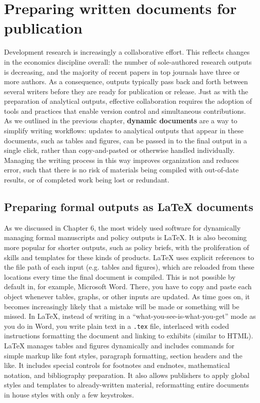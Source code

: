 \section{Preparing written documents for publication}

Development research is increasingly a collaborative effort.
This reflects changes in the economics discipline overall:
the number of sole-authored research outputs is decreasing,
and the majority of recent papers in top journals have three or more
authors.
As a consequence, outputs typically pass back and forth between several writers
before they are ready for publication or release.
Just as with the preparation of analytical outputs,
effective collaboration requires the adoption of tools and practices
that enable version control and simultaneous contributions.
As we outlined in the previous chapter,
\textbf{dynamic documents} are a way to simplify writing workflows:
updates to analytical outputs that appear in these documents, such as tables and figures,
can be passed in to the final output in a single click,
rather than copy-and-pasted or otherwise handled individually.
Managing the writing process in this way
improves organization and reduces error,
such that there is no risk of materials being compiled
with out-of-date results, or of completed work being lost or redundant.

\subsection{Preparing formal outputs as {\LaTeX} documents}

As we discussed in Chapter 6, the most widely used software
for dynamically managing formal manuscripts and policy outputs is {\LaTeX}.
It is also becoming more popular for shorter outputs,
such as policy briefs,
with the proliferation of skills and templates for these kinds of products.
\index{\LaTeX}
{\LaTeX} uses explicit references to the file path of each input (e.g. tables and figures),
which are reloaded from these locations every time the final document is compiled.
This is not possible by default in, for example, Microsoft Word.
There, you have to copy and paste each object
whenever tables, graphs, or other inputs are updated.
As time goes on, it becomes increasingly likely
that a mistake will be made or something will be missed.
In {\LaTeX}, instead of writing in a
``what-you-see-is-what-you-get'' mode as you do in Word,
you write plain text in a \texttt{.tex} file,
interlaced with coded instructions formatting the document and linking to exhibits (similar to HTML).
{\LaTeX} manages tables and figures dynamically
and includes commands for simple markup
like font styles, paragraph formatting, section headers and the like.
It includes special controls for
footnotes and endnotes, mathematical notation, and bibliography preparation.
It also allows publishers to apply global styles and templates to already-written material,
reformatting entire documents in house styles with only a few keystrokes.

